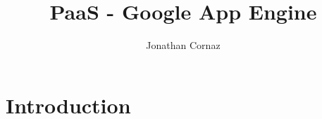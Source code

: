 \documentclass[french]{msereport}
\title{PaaS - Google App Engine}
\author{Jonathan Cornaz}
\begin{document}
	
	\section{Introduction}
\end{document}

